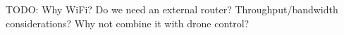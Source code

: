 TODO: Why WiFi? Do we need an external router? Throughput/bandwidth considerations? Why not combine it with drone control?